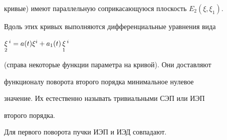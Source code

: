 кривые) имеют параллельную соприкасающуюся плоскость $E_2(\xi,\xi_1)$. 


Вдоль этих кривых выполняются дифференциальные уравнения вида 


$\mathop{\xi}\limits_2{}^i=a(t)\xi^i+a_1(t)\mathop{\xi}\limits_1{}^i$ 


(справа некоторые функции параметра на кривой). Они доставляют 


функционалу поворота второго порядка минимальное нулевое 


значение. Их естественно называть тривиальными СЭП или ИЭП 


второго порядка. 


 


\begin{thm} 


Для первого поворота пучки ИЭП и ИЭД совпадают. 


\end{thm} 


 


